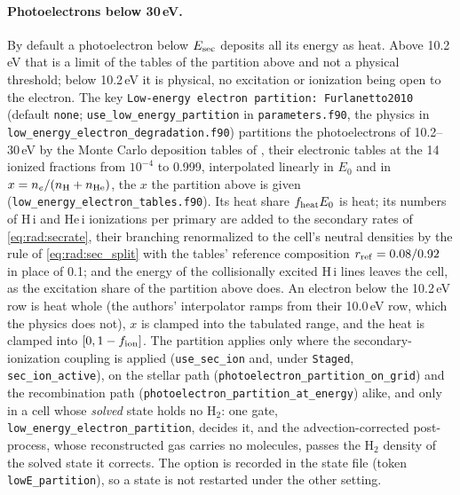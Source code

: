 \paragraph{Photoelectrons below 30\,eV.} By default a photoelectron below
$E_{\rm sec}$ deposits all its energy as heat. Above 10.2\,eV that is a
limit of the tables of the partition above and not a physical threshold;
below 10.2\,eV it is physical, no excitation or ionization being open to the
electron. The key \texttt{Low-energy electron partition: Furlanetto2010}
(default \texttt{none}; \texttt{use\_low\_energy\_partition} in
\texttt{parameters.f90}, the physics in
\texttt{low\_energy\_electron\_degradation.f90}) partitions the
photoelectrons of 10.2--30\,eV by the Monte Carlo deposition tables of
\citet{Furlanetto2010}, their electronic tables at the 14 ionized fractions
from $10^{-4}$ to 0.999, interpolated linearly in $E_0$ and in
$x = n_e/(n_{\rm H}+n_{\rm He})$, the $x$ the partition above is given
(\texttt{low\_energy\_electron\_tables.f90}). Its heat share
$f_{\rm heat}E_0$ is heat; its numbers of H\,{\sc i} and He\,{\sc i}
ionizations per primary are added to the secondary rates of
\eqref{eq:rad:secrate}, their branching renormalized to the cell's neutral
densities by the rule of \eqref{eq:rad:sec_split} with the tables' reference
composition $r_{\rm ref} = 0.08/0.92$ in place of 0.1; and the energy of the
collisionally excited H\,{\sc i} lines leaves the cell, as the excitation
share of the partition above does. An electron below the 10.2\,eV row is
heat whole (the authors' interpolator ramps from their 10.0\,eV row, which
the physics does not), $x$ is clamped into the tabulated range, and the heat
is clamped into $[0,1-f_{\rm ion}]$. The partition applies only where the
secondary-ionization coupling is applied (\texttt{use\_sec\_ion} and, under
\texttt{Staged}, \texttt{sec\_ion\_active}), on the stellar path
(\texttt{photoelectron\_partition\_on\_grid}) and the recombination path
(\texttt{photoelectron\_partition\_at\_energy}) alike, and only in a cell
whose \emph{solved} state holds no H$_2$: one gate,
\texttt{low\_energy\_electron\_partition}, decides it, and the
advection-corrected post-process, whose reconstructed gas carries no
molecules, passes the H$_2$ density of the solved state it corrects. The
option is recorded in the state file (token \texttt{lowE\_partition}), so a
state is not restarted under the other setting.

